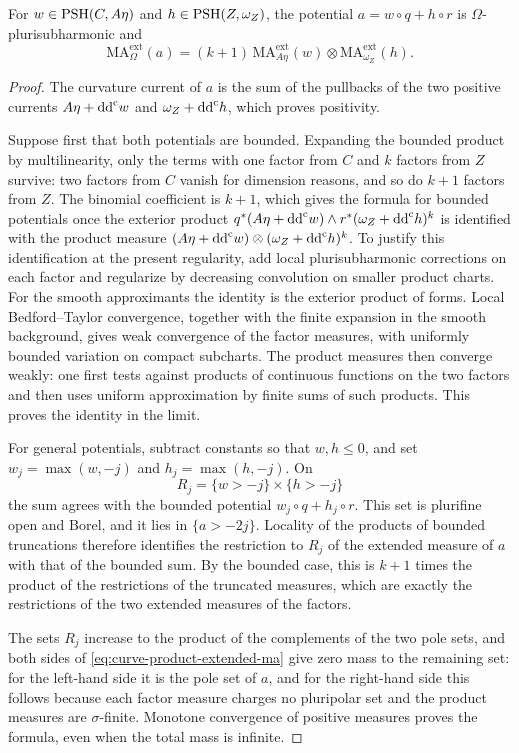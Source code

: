 \begin{proposition}\label{prop:curve-product-extended-ma}
For $w\in\mathrm{PSH}(C,A\eta)$ and $h\in\mathrm{PSH}(Z,\omega_Z)$, the potential $a=w\circ q+h\circ r$ is $\Omega$-plurisubharmonic and
\begin{equation}\label{eq:curve-product-extended-ma}
 \mathrm{MA}^{\mathrm{ext}}_\Omega(a)
 =(k+1)\,
       \mathrm{MA}^{\mathrm{ext}}_{A\eta}(w)
                \otimes\mathrm{MA}^{\mathrm{ext}}_{\omega_Z}(h).
\end{equation}
\end{proposition}
\begin{proof}
The curvature current of $a$ is the sum of the pullbacks of the two positive currents $A\eta+\mathrm{dd}^{\mathrm{c}} w$ and $\omega_Z+\mathrm{dd}^{\mathrm{c}} h$, which proves positivity.

Suppose first that both potentials are bounded. Expanding the bounded product by multilinearity, only the terms with one factor from $C$ and $k$ factors from $Z$ survive: two factors from $C$ vanish for dimension reasons, and so do $k+1$ factors from $Z$. The binomial coefficient is $k+1$, which gives the formula for bounded potentials once the exterior product $q^*(A\eta+\mathrm{dd}^{\mathrm{c}} w)\wedge r^*(\omega_Z+\mathrm{dd}^{\mathrm{c}} h)^k$ is identified with the product measure $(A\eta+\mathrm{dd}^{\mathrm{c}} w)\otimes(\omega_Z+\mathrm{dd}^{\mathrm{c}} h)^k$. To justify this identification at the present regularity, add local plurisubharmonic corrections on each factor and regularize by decreasing convolution on smaller product charts. For the smooth approximants the identity is the exterior product of forms. Local Bedford--Taylor convergence, together with the finite expansion in the smooth background, gives weak convergence of the factor measures, with uniformly bounded variation on compact subcharts. The product measures then converge weakly: one first tests against products of continuous functions on the two factors and then uses uniform approximation by finite sums of such products. This proves the identity in the limit.

For general potentials, subtract constants so that $w,h\leq0$, and set $w_j=\max(w,-j)$ and $h_j=\max(h,-j)$. On
\[
 R_j=\{w>-j\}\times\{h>-j\}
\]
the sum agrees with the bounded potential $w_j\circ q+h_j\circ r$. This set is plurifine open and Borel, and it lies in $\{a>-2j\}$. Locality of the products of bounded truncations therefore identifies the restriction to $R_j$ of the extended measure of $a$ with that of the bounded sum. By the bounded case, this is $k+1$ times the product of the restrictions of the truncated measures, which are exactly the restrictions of the two extended measures of the factors.

The sets $R_j$ increase to the product of the complements of the two pole sets, and both sides of \eqref{eq:curve-product-extended-ma} give zero mass to the remaining set: for the left-hand side it is the pole set of $a$, and for the right-hand side this follows because each factor measure charges no pluripolar set and the product measures are $\sigma$-finite. Monotone convergence of positive measures proves the formula, even when the total mass is infinite.
\end{proof}

